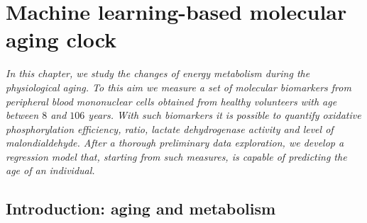 
\chapter{Machine learning-based molecular aging clock} \label{chap:frassoni}


\begin{displayquote}
	\textit{In this chapter, we study the changes of energy metabolism during the physiological aging. To this aim we measure a set of molecular biomarkers from peripheral blood mononuclear cells obtained from healthy volunteers with age between $8$ and $106$ years. With such biomarkers it is possible to quantify oxidative phosphorylation efficiency, \atpamp ratio, lactate dehydrogenase activity and level of malondialdehyde. After a thorough preliminary data exploration, we develop a regression model that, starting from such measures, is capable of predicting the age of an individual.}
\end{displayquote}

\section{Introduction: aging and metabolism} \label{sec:frassoni_intro}

